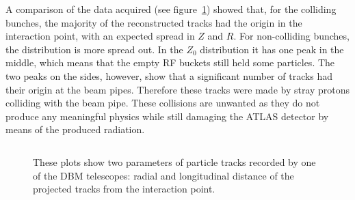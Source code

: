 \documentclass[12pt]{packages/mytustyle}  %
\begin{document}
A comparison of the data acquired (see figure~\ref{fig:realdata}) showed that, for the colliding bunches, the majority of the reconstructed tracks had the origin in the interaction point, with an expected spread in $Z$ and $R$. For non-colliding bunches, the distribution is more spread out. In the $Z_0$ distribution it has one peak in the middle, which means that the empty RF buckets still held some particles. The two peaks on the sides, however, show that a significant number of tracks had their origin at the beam pipes. Therefore these tracks were made by stray protons colliding with the beam pipe. These collisions are unwanted as they do not produce any meaningful physics while still damaging the ATLAS detector by means of the produced radiation.




\begin{figure}[!t]
\label{fig:realdata}
\begin{tabular}{cccc}
\end{tabular}
\caption{These plots show two parameters of particle tracks recorded by one of the DBM telescopes: radial and longitudinal distance of the projected tracks from the interaction point.}
\end{figure}




\end{document}
